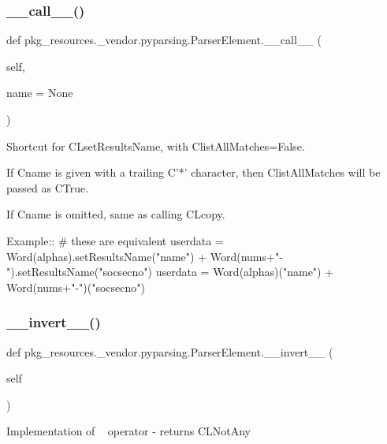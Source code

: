\subsubsection{\texorpdfstring{\+\_\+\+\_\+call\+\_\+\+\_\+()}{\_\_call\_\_()}}
{\footnotesize\ttfamily def pkg\+\_\+resources.\+\_\+vendor.\+pyparsing.\+Parser\+Element.\+\_\+\+\_\+call\+\_\+\+\_\+ (\begin{DoxyParamCaption}\item[{}]{self,  }\item[{}]{name = {\ttfamily None} }\end{DoxyParamCaption})}

\begin{DoxyVerb}Shortcut for C{L{setResultsName}}, with C{listAllMatches=False}.

If C{name} is given with a trailing C{'*'} character, then C{listAllMatches} will be
passed as C{True}.
   
If C{name} is omitted, same as calling C{L{copy}}.

Example::
    # these are equivalent
    userdata = Word(alphas).setResultsName("name") + Word(nums+"-").setResultsName("socsecno")
    userdata = Word(alphas)("name") + Word(nums+"-")("socsecno")             
\end{DoxyVerb}
 \mbox{\label{classpkg__resources_1_1__vendor_1_1pyparsing_1_1_parser_element_a813a4166ab934c5019a681b36784d2d3}} 
\subsubsection{\texorpdfstring{\+\_\+\+\_\+invert\+\_\+\+\_\+()}{\_\_invert\_\_()}}
{\footnotesize\ttfamily def pkg\+\_\+resources.\+\_\+vendor.\+pyparsing.\+Parser\+Element.\+\_\+\+\_\+invert\+\_\+\+\_\+ (\begin{DoxyParamCaption}\item[{}]{self }\end{DoxyParamCaption})}

\begin{DoxyVerb}Implementation of ~ operator - returns C{L{NotAny}}
\end{DoxyVerb}
 \mbox{\label{classpkg__resources_1_1__vendor_1_1pyparsing_1_1_parser_element_a6835cd6d6ff852803d7719c0428f6745}} 
